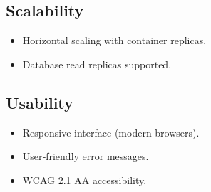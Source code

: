 \subsection{Scalability}
\begin{itemize}
    \item Horizontal scaling with container replicas.
    \item Database read replicas supported.
\end{itemize}

\subsection{Usability}
\begin{itemize}
    \item Responsive interface (modern browsers).
    \item User‑friendly error messages.
    \item WCAG 2.1 AA accessibility.
\end{itemize}

